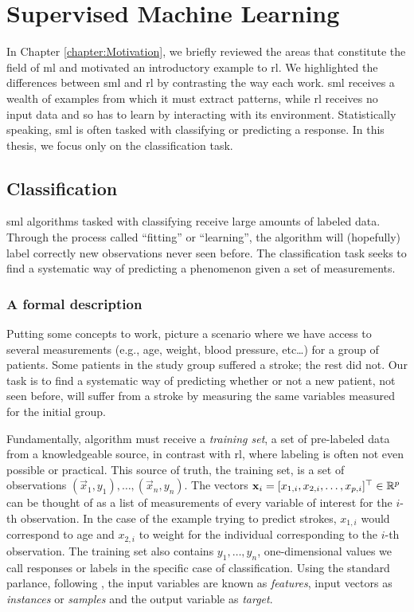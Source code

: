 \chapter{Supervised Machine Learning}
\label{chapter:SupervisedLearning}

In Chapter \ref{chapter:Motivation}, we briefly reviewed the areas that
constitute the field of \ac{ml} and motivated an introductory example to
\acl{rl}. We highlighted the differences between \ac{sml} and \ac{rl} by
contrasting the way each work. \Ac{sml} receives a wealth of examples from which
it must extract patterns, while \ac{rl} receives no input data and so has to
learn by interacting with its environment. Statistically speaking, \ac{sml} is
often tasked with classifying or predicting a response. In this thesis, we focus
only on the classification task.

\section{Classification}

\Ac{sml} algorithms tasked with classifying receive large amounts of
labeled data. Through the process called ``fitting'' or ``learning'', the
algorithm will (hopefully) label correctly new observations never seen before.
The classification task seeks to find a systematic way of predicting a
phenomenon given a set of measurements.

\subsection{A formal description} \label{sss:formalizing-trees}

Putting some concepts to work, picture a scenario where we have access to
several measurements (e.g., age, weight, blood pressure, etc\dots) for a group
of patients. Some patients in the study group suffered a stroke; the rest did
not. Our task is to find a systematic way of predicting whether or not a new
patient, not seen before, will suffer from a stroke by measuring the same
variables measured for the initial group.

Fundamentally,  algorithm must receive a \textit{training set}, a set
of pre-labeled data from a knowledgeable source, in contrast with \ac{rl}, where
labeling is often not even possible or practical. This source of truth, the
training set, is a set of observations $(\vec{x}_1, y_1), \dots, (\vec{x}_n,
y_n)$. The vectors $\mathbf{x}_i = [x_{1, i}, x_{2, i}, \dots, x_{p, i}]^{\top} \in
\mathbb{R}^{p}$ can be thought of as a list of measurements of every variable of
interest for the $i$-th observation. In the case of the example trying to
predict strokes, $x_{1, i}$ would correspond to age and $x_{2, i}$ to weight for
the individual corresponding to the $i$-th observation. The training set also
contains $y_1, \dots, y_n$, one-dimensional values we call responses or labels
in the specific case of classification. Using the standard parlance, following
\cite{louppe2014}, the input variables are known as \textit{features}, input
vectors as \textit{instances} or \textit{samples} and the output variable as
\textit{target}.

